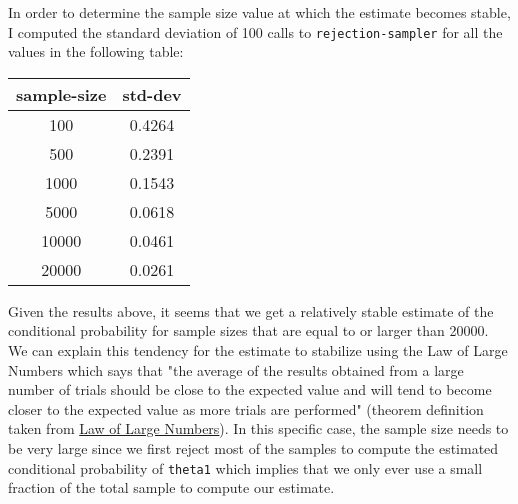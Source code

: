 \documentclass[10pt]{article}
\begin{document}
\begin{mdframed}
In order to determine the sample size value at which the estimate becomes stable, I computed the standard deviation of 100 calls to \texttt{rejection-sampler} for all the values in the following table:

\begin{center}
\begin{tabular}{||c c||} 
 \hline
 sample-size & std-dev \\ [0.5ex] 
 \hline\hline
 100 & 0.4264  \\ 
 \hline
 500 & 0.2391 \\
 \hline
 1000 & 0.1543 \\
 \hline
 5000 & 0.0618 \\
 \hline
 10000 & 0.0461 \\ 
 \hline
 20000 & 0.0261 \\ [1ex] 
 \hline
\end{tabular}
\end{center}

Given the results above, it seems that we get a relatively stable estimate of the conditional probability for sample sizes that are equal to or larger than 20000. We can explain this tendency for the estimate to stabilize using the Law of Large Numbers which says that "the average of the results obtained from a large number of trials should be close to the expected value and will tend to become closer to the expected value as more trials are performed" (theorem definition taken from \href{https://en.wikipedia.org/wiki/Law_of_large_numbers}{Law of Large Numbers}). In this specific case, the sample size needs to be very large since we first reject most of the samples to compute the estimated conditional probability of \texttt{theta1} which implies that we only ever use a small fraction of the total sample to compute our estimate.
\end{mdframed}
\end{document}
